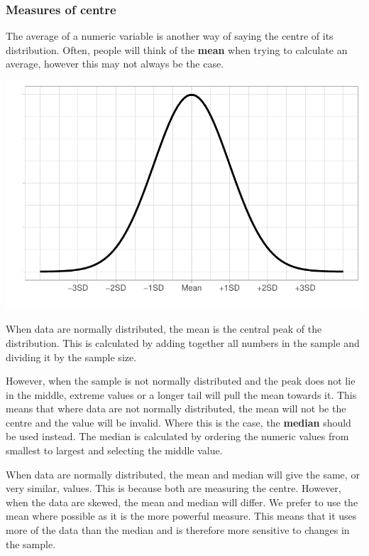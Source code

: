 \documentclass[
  letterpaper,
  DIV=11,
  numbers=noendperiod]{scrreprt}
\begin{document}
\subsubsection{Measures of centre}\label{measures-of-centre}

The average of a numeric variable is another way of saying the centre of
its distribution. Often, people will think of the \textbf{mean} when
trying to calculate an average, however this may not always be the case.

\includegraphics{combining_summarising_files/figure-pdf/normal distribution-1.pdf}

When data are normally distributed, the mean is the central peak of the
distribution. This is calculated by adding together all numbers in the
sample and dividing it by the sample size.

However, when the sample is not normally distributed and the peak does
not lie in the middle, extreme values or a longer tail will pull the
mean towards it. This means that where data are not normally
distributed, the mean will not be the centre and the value will be
invalid. Where this is the case, the \textbf{median} should be used
instead. The median is calculated by ordering the numeric values from
smallest to largest and selecting the middle value.

When data are normally distributed, the mean and median will give the
same, or very similar, values. This is because both are measuring the
centre. However, when the data are skewed, the mean and median will
differ. We prefer to use the mean where possible as it is the more
powerful measure. This means that it uses more of the data than the
median and is therefore more sensitive to changes in the sample.
\end{document}
